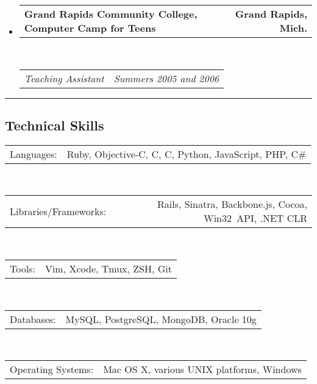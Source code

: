 \documentclass[12pt,letterpaper]{article}
\makeatletter
\newenvironment{indentedsection}[1]
{\begin{list}{}
  {\setlength{\leftmargin}{#1}}
  \item[]
}
{\end{list}}
\newcommand{\floatcols}[2]
{\begin{tabular*}{\linewidth}{l@{\extracolsep{\fill}}r}
  #1 &
  #2 \\
\end{tabular*}}
\newcommand{\CPP}
{C\nolinebreak[4]\hspace{-.05em}\raisebox{.22ex}{\footnotesize\bf ++}}
\makeatother
\begin{document}
\begin{itemize}
  \item
    \floatcols
      {\textbf{Grand Rapids Community College, Computer Camp for Teens}}
      {\textbf{Grand Rapids, Mich.}}
    \\
    \floatcols
      {\emph{Teaching Assistant}}
      {\emph{Summers 2005 and 2006}}
\end{itemize}


\hrule
\vspace{-0.4em}
\subsection*{Technical Skills}

\begin{indentedsection}{\parindent}
  \floatcols
    {Languages:}
    {Ruby, Objective-C, C, \CPP, Python, JavaScript, PHP, C\#}
  \\[.4em]
  \floatcols
    {Libraries/Frameworks:}
    {Rails, Sinatra, Backbone.js, Cocoa, Win32~API, .NET CLR}
  \\[.4em]
  \floatcols
    {Tools:}
    {Vim, Xcode, Tmux, ZSH, Git}
  \\[.4em]
  \floatcols
    {Databases:}
    {MySQL, PostgreSQL, MongoDB, Oracle 10g}
  \\[.4em]
  \floatcols
    {Operating Systems:}
    {Mac OS X, various UNIX platforms, Windows}
\end{indentedsection}
\end{document}
